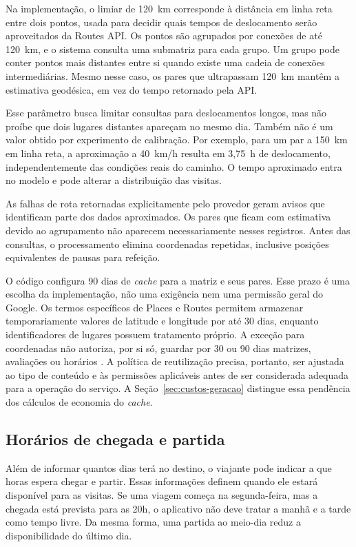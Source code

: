 Na implementação, o limiar de 120~km corresponde à distância em linha reta entre dois pontos, usada para decidir quais tempos de deslocamento serão aproveitados da Routes API. Os pontos são agrupados por conexões de até 120~km, e o sistema consulta uma submatriz para cada grupo. Um grupo pode conter pontos mais distantes entre si quando existe uma cadeia de conexões intermediárias. Mesmo nesse caso, os pares que ultrapassam 120~km mantêm a estimativa geodésica, em vez do tempo retornado pela API.

Esse parâmetro busca limitar consultas para deslocamentos longos, mas não proíbe que dois lugares distantes apareçam no mesmo dia. Também não é um valor obtido por experimento de calibração. Por exemplo, para um par a 150~km em linha reta, a aproximação a 40~km/h resulta em 3,75~h de deslocamento, independentemente das condições reais do caminho. O tempo aproximado entra no modelo e pode alterar a distribuição das visitas.

As falhas de rota retornadas explicitamente pelo provedor geram avisos que identificam parte dos dados aproximados. Os pares que ficam com estimativa devido ao agrupamento não aparecem necessariamente nesses registros. Antes das consultas, o processamento elimina coordenadas repetidas, inclusive posições equivalentes de pausas para refeição.

O código configura 90 dias de \textit{cache} para a matriz e seus pares. Esse prazo é uma escolha da implementação, não uma exigência nem uma permissão geral do Google. Os termos específicos de Places e Routes permitem armazenar temporariamente valores de latitude e longitude por até 30 dias, enquanto identificadores de lugares possuem tratamento próprio. A exceção para coordenadas não autoriza, por si só, guardar por 30 ou 90 dias matrizes, avaliações ou horários \cite{google_maps_termos2026,google_places_politicas2026}. A política de reutilização precisa, portanto, ser ajustada ao tipo de conteúdo e às permissões aplicáveis antes de ser considerada adequada para a operação do serviço. A Seção~\ref{sec:custos-geracao} distingue essa pendência dos cálculos de economia do \textit{cache}.

\subsection{Horários de chegada e partida}
\label{sec:chegada-partida}

Além de informar quantos dias terá no destino, o viajante pode indicar a que horas espera chegar e partir. Essas informações definem quando ele estará disponível para as visitas. Se uma viagem começa na segunda-feira, mas a chegada está prevista para as 20h, o aplicativo não deve tratar a manhã e a tarde como tempo livre. Da mesma forma, uma partida ao meio-dia reduz a disponibilidade do último dia.

